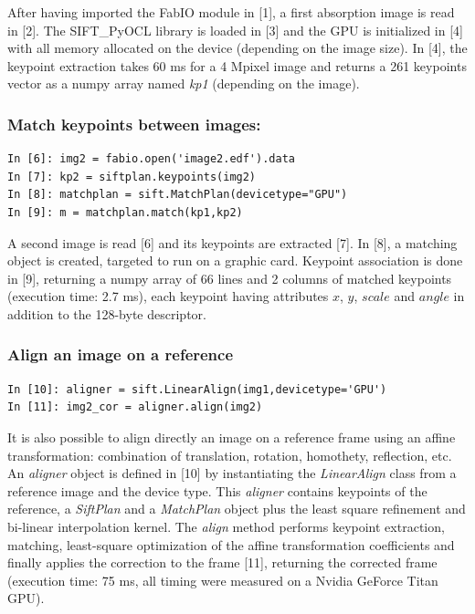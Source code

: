 \documentclass[preprint]{iucr}
\begin{document}
After having imported the FabIO \cite{fabio} module in [1], a first
absorption image is read in [2]. The SIFT\_PyOCL library is loaded in [3] and the
GPU is initialized in [4] with all memory allocated on the device (depending on
the image size).
In [4], the keypoint extraction takes 60 ms for a
4 Mpixel image and returns a 261 keypoints vector as a numpy array named
\emph{kp1} (depending on the image).

\subsubsection{Match keypoints between images:}
\begin{verbatim}
In [6]: img2 = fabio.open('image2.edf').data
In [7]: kp2 = siftplan.keypoints(img2)
In [8]: matchplan = sift.MatchPlan(devicetype="GPU")
In [9]: m = matchplan.match(kp1,kp2)
\end{verbatim}
A second image is read [6] and its keypoints are extracted [7].
In [8], a matching object is created, targeted to run on a graphic card.
Keypoint association is done in [9], returning a numpy array of 66 lines and 2
columns of matched keypoints (execution time: 2.7 ms), each keypoint having
attributes $x$, $y$, $scale$ and $angle$ in addition to the 128-byte descriptor.

\subsubsection{Align an image on a reference}
\begin{verbatim}
In [10]: aligner = sift.LinearAlign(img1,devicetype='GPU')
In [11]: img2_cor = aligner.align(img2)
\end{verbatim}
It is also possible to align directly an image on a reference frame using an
affine transformation: combination of translation, rotation, homothety,
reflection, etc.
An \emph{aligner} object is defined in [10] by instantiating the
\emph{LinearAlign} class from a reference image and the device type.
This \emph{aligner} contains keypoints of the
reference, a \emph{SiftPlan} and a \emph{MatchPlan} object plus the least square
refinement and bi-linear interpolation kernel.
The \emph{align} method performs keypoint extraction, matching, least-square
optimization of the affine transformation coefficients and finally applies the
correction to the frame [11], returning the corrected frame (execution time:
75 ms, all timing were measured on a Nvidia GeForce Titan GPU).
\end{document}
